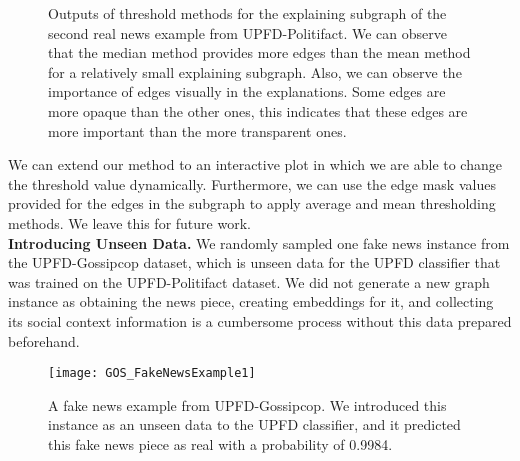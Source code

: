 \begin{figure}
    \centering
    \hfill
    \hfill
    \hfill
    \caption[Outputs of threshold methods for the explaining subgraph of the second real news example from UPFD-Politifact.]{Outputs of threshold methods for the explaining subgraph of the second real news example from UPFD-Politifact. We can observe that the median method provides more edges than the mean method for a relatively small explaining subgraph. Also, we can observe the importance of edges visually in the explanations. Some edges are more opaque than the other ones, this indicates that these edges are more important than the more transparent ones.}
    \label{fig:POL_RealNewsExample2Explanation_with_threshold}
\end{figure}
We can extend our method to an interactive plot in which we are able to change the threshold value dynamically. Furthermore, we can use the edge mask values provided for the edges in the subgraph to apply average and mean thresholding methods. We leave this for future work.\\
\textbf{Introducing Unseen Data.} We randomly sampled one fake news instance from the UPFD-Gossipcop dataset, which is unseen data for the UPFD classifier that was trained on the UPFD-Politifact dataset. We did not generate a new graph instance as obtaining the news piece, creating embeddings for it, and collecting its social context information is a cumbersome process without this data prepared beforehand.\\
\begin{figure}
    \centering
    \texttt{[image: GOS\_FakeNewsExample1]}
    \caption[A fake news example from UPFD-Gossipcop.]{A fake news example from UPFD-Gossipcop. We introduced this instance as an unseen data to the UPFD classifier, and it predicted this fake news piece as real with a probability of 0.9984.}
    \label{fig:GOS_FakeNewsExample1}
\end{figure}
